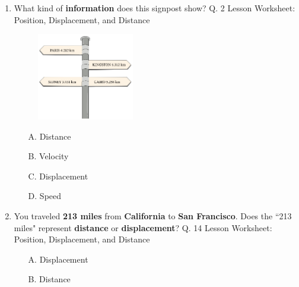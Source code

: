 \documentclass[A4,12pt]{article}
\begin{document}
\begin{enumerate}[label=\bfseries (\arabic*)]
\item What kind of \textbf{information} does this signpost show? \cite{Nagwa} Q. 2 Lesson Worksheet: Position, Displacement, and Distance
%
\begin{figure}[H]
    \centering
    \includegraphics[width=0.4\textwidth]{Nagwa_Q2_D.png}
\end{figure}
%
\begin{multicols}{4}
\begin{itemize}
    \item[A.] Distance
    \item[B.] Velocity
    \item[C.] Displacement
    \item[D.] Speed
\end{itemize}
\end{multicols}







\item You traveled \textbf{213 miles} from \textbf{California} to \textbf{San Francisco}. Does the ``213 miles" represent \textbf{distance} or \textbf{displacement}? \cite{Nagwa} Q. 14 Lesson Worksheet: Position, Displacement, and Distance
%
\begin{multicols}{2}
\begin{itemize}
    \item[A.] Displacement
    \item[B.] Distance
\end{itemize}
\end{multicols}













\end{enumerate}
\end{document}
